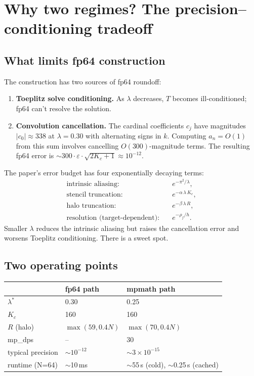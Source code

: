\documentclass[11pt]{article}
\begin{document}
\section{Why two regimes? The precision--conditioning tradeoff}

\subsection{What limits fp64 construction}

The construction has two sources of fp64 roundoff:
\begin{enumerate}
  \item \textbf{Toeplitz solve conditioning.} As $\lambda$ decreases, $T$ becomes ill-conditioned; fp64 can't resolve the solution.
  \item \textbf{Convolution cancellation.} The cardinal coefficients $c_j$ have magnitudes $|c_0|\approx 338$ at $\lambda=0.30$ with alternating signs in $k$. Computing $a_n = O(1)$ from this sum involves cancelling $O(300)$-magnitude terms. The resulting fp64 error is $\sim 300 \cdot \varepsilon \cdot \sqrt{2K_c+1} \approx 10^{-12}$.
\end{enumerate}

The paper's error budget has four exponentially decaying terms:
\begin{align*}
  \text{intrinsic aliasing:} &\quad e^{-\pi^2/\lambda}, \\
  \text{stencil truncation:} &\quad e^{-\alpha\,\lambda\,K_c}, \\
  \text{halo truncation:}    &\quad e^{-\beta\,\lambda\,R}, \\
  \text{resolution (target-dependent):} &\quad e^{-\rho_f/h}.
\end{align*}
Smaller $\lambda$ reduces the intrinsic aliasing but raises the cancellation error and worsens Toeplitz conditioning. There is a sweet spot.

\subsection{Two operating points}

\begin{center}
\begin{tabular}{lll}
\toprule
  & \textbf{fp64 path} & \textbf{mpmath path} \\
\midrule
$\lambda^*$        & 0.30 & 0.25 \\
$K_c$              & 160 & 160 \\
$R$ (halo)         & $\max(59, 0.4N)$ & $\max(70, 0.4N)$ \\
mp\_dps            & -- & 30 \\
typical precision  & $\sim 10^{-12}$ & $\sim 3\times 10^{-15}$ \\
runtime (N=64)     & $\sim$10\,ms & $\sim$55\,s (cold), $\sim$0.25\,s (cached) \\
\bottomrule
\end{tabular}
\end{center}
\end{document}
